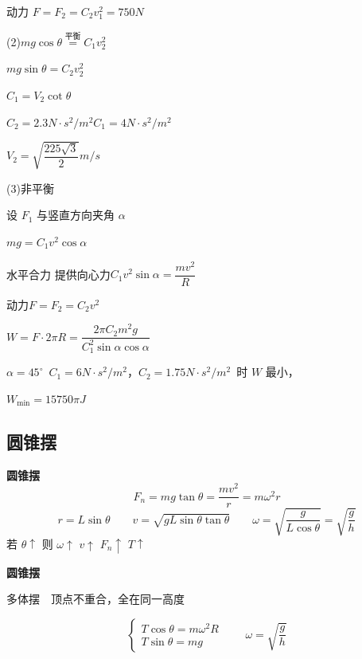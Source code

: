 \begin{problem}
\begin{solution}
\par 动力 $F=F_2=C_2v_1^2=750\unit{N}$
\par (2)\quad $mg\cos\theta\overset{\text{平衡}}{=}C_1v_2^2$
\par $mg\sin\theta=C_2v_2^2$
\par $C_1=V_2\cot\theta$ %
\par $C_2=2.3\unit{N\cdot s^2/m^2}$\quad $C_1=4\unit{N\cdot s^2/m^2}$
\par $V_2=\sqrt{\dfrac{225\sqrt{3}}{2}}\unit{m/s}$
\par (3)\quad 非平衡
\par 设 $F_1$ 与竖直方向夹角 $\alpha$
\par $mg=C_1v^2\cos\alpha$
\par 水平合力 提供向心力\quad $C_1v^2\sin\alpha=\dfrac{mv^2}{R}$
\par 动力\quad $F=F_2=C_2v^2$
\par $W=F\cdot 2\pi R=\dfrac{2\pi C_2m^2g}{C_1^2\sin\alpha\cos\alpha}$
\par $\alpha=45^\circ$\ $C_1=6\unit{N\cdot s^2/m^2}$，$C_2=1.75\unit{N\cdot s^2/m^2}$\ 时 $W$ 最小， %
\par $W_{\min}=15750\pi\unit{J}$
\end{solution}
\end{problem}

\subsection{圆锥摆}
\textbf{圆锥摆}
\[
F_n=mg\tan\theta=\frac{mv^2}{r}=m\omega^2r
\]
\[
r=L\sin\theta\qquad v=\sqrt{gL\sin\theta\tan\theta}\qquad \omega=\sqrt{\frac{g}{L\cos\theta}}=\sqrt{\frac{g}{h}}
\]
若 $\theta\uparrow$ 则 $\omega\uparrow$ $v\uparrow$ $F_n\uparrow$ $T\uparrow$

\textbf{圆锥摆}


多体摆　顶点不重合，全在同一高度

\[
\left\{\begin{array}{l}
T\cos\theta=m\omega^2R\\
T\sin\theta=mg
\end{array}\right.
\qquad
\omega=\sqrt{\frac{g}{h}}
\]

